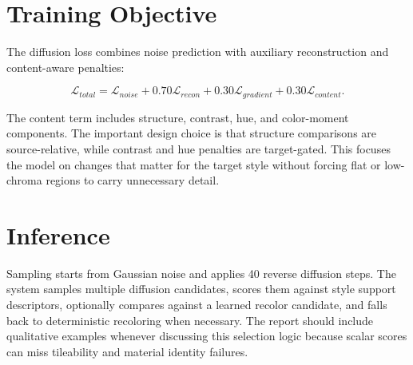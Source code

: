 \section{Training Objective}

The diffusion loss combines noise prediction with auxiliary reconstruction and content-aware penalties:

\begin{equation}
  \mathcal{L}_{total}
  =
  \mathcal{L}_{noise}
  + 0.70\mathcal{L}_{recon}
  + 0.30\mathcal{L}_{gradient}
  + 0.30\mathcal{L}_{content}.
\end{equation}

The content term includes structure, contrast, hue, and color-moment components.
The important design choice is that structure comparisons are source-relative, while contrast and hue penalties are target-gated.
This focuses the model on changes that matter for the target style without forcing flat or low-chroma regions to carry unnecessary detail.

\section{Inference}

Sampling starts from Gaussian noise and applies 40 reverse diffusion steps.
The system samples multiple diffusion candidates, scores them against style support descriptors, optionally compares against a learned recolor candidate, and falls back to deterministic recoloring when necessary.
The report should include qualitative examples whenever discussing this selection logic because scalar scores can miss tileability and material identity failures.
